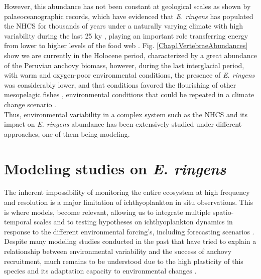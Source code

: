 However, this abundance has not been constant at geological scales as shown by palaeoceanographic records, which have evidenced that \textit{E. ringens} has populated the NHCS for thousands of years under a naturally varying climate with high variability during the last 25 ky \citep{Salv2018,Salv2019,Salv2022}, playing an important role transferring energy from lower to higher levels of the food web \citep{ChecAsch2017}. Fig. \ref{Chap1VertebraeAbundances} show we are currently in the Holocene period, characterized by a great abundance of the Peruvian anchovy biomass, however, during the last interglacial period, with warm and oxygen-poor environmental conditions, the presence of \textit{E. ringens} was considerably lower, and that conditions favored the flourishing of other mesopelagic fishes \citep{Salv2022}, environmental conditions that could be repeated in a climate change scenario \citep{EcheGeva2020}.\\

Thus, environmental variability in a complex system such as the NHCS and its impact on \textit{E. ringens} abundance has been extensively studied under different approaches, one of them being modeling.\\

\clearpage

\section{Modeling studies on \textit{E. ringens}}\label{Chap1ModeAnch}

The inherent impossibility of monitoring the entire ecosystem at high frequency and resolution is a major limitation of ichthyoplankton in situ observations. This is where models, become relevant, allowing us to integrate multiple spatio-temporal scales and to testing hypotheses on ichthyoplankton dynamics in response to the different  environmental forcing’s, including forecasting scenarios \citep{GearDode2020}.\\

Despite many modeling studies conducted in the past \citep{LettPenv2007,BrocLett2008,GutiRami2008,OlivPena2011,XuChai2013} that have tried to explain a relationship between environmental variability and the success of anchovy recruitment, much remains to be understood due to the high plasticity of this species and its adaptation capacity to environmental changes \citep{EspiBert2008,EspiBert2014,CanaAdas2018,PlazCern2018}.\\

